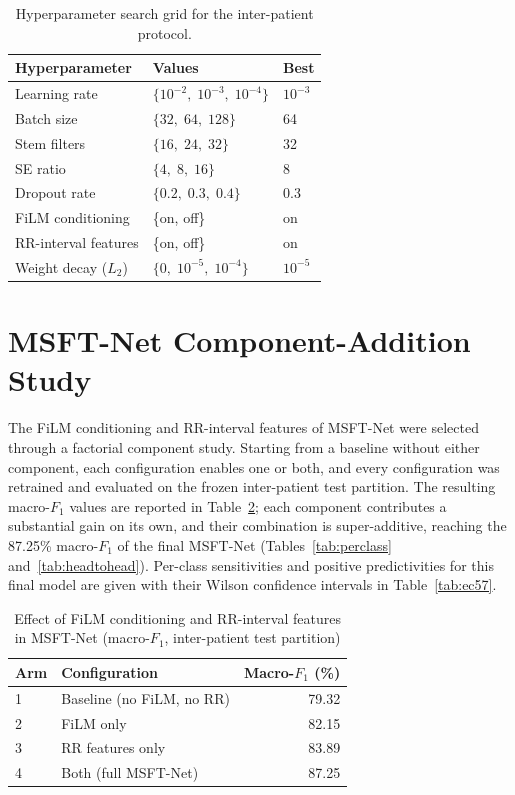 \begin{table}[!t]
\centering
\caption{Hyperparameter search grid for the inter-patient protocol.}
\label{tab:grid}
\begin{tabular}{@{}lll@{}}
\toprule
\textbf{Hyperparameter} & \textbf{Values} & \textbf{Best} \\
\midrule
Learning rate       & $\{10^{-2},\; 10^{-3},\; 10^{-4}\}$
                    & $10^{-3}$ \\
Batch size          & $\{32,\; 64,\; 128\}$
                    & 64 \\
Stem filters        & $\{16,\; 24,\; 32\}$
                    & 32 \\
SE ratio            & $\{4,\; 8,\; 16\}$
                    & 8 \\
Dropout rate        & $\{0.2,\; 0.3,\; 0.4\}$
                    & 0.3 \\
FiLM conditioning   & \{on,\; off\}
                    & on \\
RR-interval features & \{on,\; off\}
                    & on \\
Weight decay ($L_2$) & $\{0,\; 10^{-5},\; 10^{-4}\}$
                    & $10^{-5}$ \\
\bottomrule
\end{tabular}
\end{table}


\section{MSFT-Net Component-Addition Study}
\label{app:ablation}

The FiLM conditioning and RR-interval features of MSFT-Net were selected
through a factorial component study. Starting from a baseline without
either component, each configuration enables one or both, and every
configuration was retrained and evaluated on the frozen inter-patient test
partition. The resulting macro-$F_1$ values are reported in
Table~\ref{tab:msft_addition}; each component contributes a substantial
gain on its own, and their combination is super-additive, reaching the 87.25\% macro-$F_1$ of the final MSFT-Net
(Tables~\ref{tab:perclass} and~\ref{tab:headtohead}). Per-class sensitivities and positive
predictivities for this final model are given with their Wilson confidence
intervals in Table~\ref{tab:ec57}.

\begin{table}[!t]
\centering
\caption{Effect of FiLM conditioning and RR-interval features in MSFT-Net (macro-$F_1$, inter-patient test partition)}
\label{tab:msft_addition}
\begin{tabular}{@{}llr@{}}
\toprule
\textbf{Arm} & \textbf{Configuration} & \textbf{Macro-$F_1$ (\%)} \\
\midrule
1 & Baseline (no FiLM, no RR) & 79.32 \\
2 & FiLM only                 & 82.15 \\
3 & RR features only          & 83.89 \\
4 & Both (full MSFT-Net)      & 87.25 \\
\bottomrule
\end{tabular}
\end{table}



